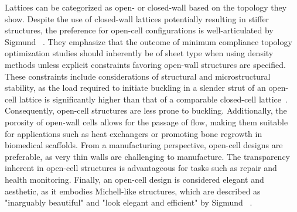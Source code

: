 Lattices can be categorized as open- or closed-wall based on the topology they show. Despite the use of closed-wall lattices potentially resulting in stiffer structures, the preference for open-cell configurations is well-articulated by Sigmund \etal~. They emphasize that the outcome of minimum compliance topology optimization studies should inherently be of sheet type when using density methods unless explicit constraints favoring open-wall structures are specified. These constraints include considerations of structural and microstructural stability, as the load required to initiate buckling in a slender strut of an open-cell lattice is significantly higher than that of a comparable closed-cell lattice~. Consequently, open-cell structures are less prone to buckling. Additionally, the porosity of open-wall cells allows for the passage of flow, making them suitable for applications such as heat exchangers or promoting bone regrowth in biomedical scaffolds. From a manufacturing perspective, open-cell designs are preferable, as very thin walls are challenging to manufacture. The transparency inherent in open-cell structures is advantageous for tasks such as repair and health monitoring. Finally, an open-cell design is considered elegant and aesthetic, as it embodies Michell-like structures, which are described as "inarguably beautiful" and "look elegant and efficient" by Sigmund \etal~\cite{sigmund_non-optimality_2016}.

